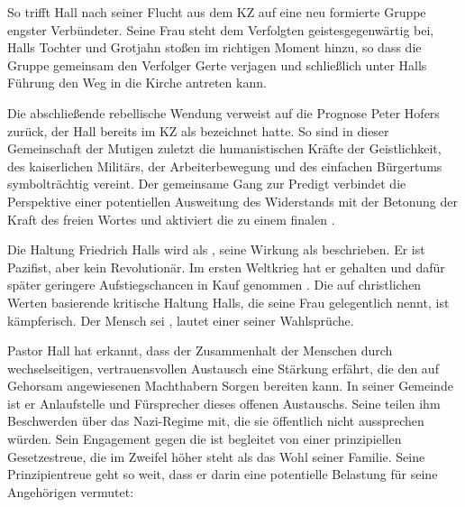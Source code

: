 So trifft Hall nach seiner Flucht aus dem KZ auf eine neu formierte Gruppe
engster Verbündeter. Seine Frau steht dem Verfolgten geistesgegenwärtig bei,
Halls Tochter und Grotjahn stoßen im richtigen Moment hinzu, so dass die
Gruppe gemeinsam den Verfolger Gerte verjagen und schließlich unter Halls
Führung den Weg in die Kirche antreten kann.

Die abschließende rebellische Wendung verweist auf die Prognose Peter Hofers
zurück, der Hall bereits im
KZ als \Cite{Rebell} bezeichnet hatte. So sind in dieser Gemeinschaft
der Mutigen zuletzt die humanistischen Kräfte der Geistlichkeit, des kaiserlichen
Militärs, der Arbeiterbewegung und des einfachen Bürgertums symbolträchtig
vereint. Der gemeinsame Gang zur Predigt verbindet die Perspektive einer
potentiellen Ausweitung des Widerstands mit der Betonung der Kraft des
freien Wortes und aktiviert die  zu
einem finalen .


Die Haltung Friedrich Halls wird als \Cite{betont gerade}, seine Wirkung als
\Cite{nie pathetisch}
beschrieben. Er ist Pazifist, aber kein Revolutionär. Im ersten Weltkrieg
hat er \Cite{Friedenspredigten} gehalten und dafür später geringere
Aufstiegschancen in Kauf genommen . Die auf christlichen
Werten basierende kritische Haltung Halls, die seine Frau gelegentlich
\Cite{Fanatismus} nennt, ist
kämpferisch. Der Mensch sei \Cite{nicht auf dieser Welt, um der Gefahr
  auszuweichen} , lautet einer seiner Wahlsprüche.  

Pastor Hall hat erkannt, dass der Zusammenhalt der Menschen durch
wechselseitigen, vertrauensvollen Austausch eine Stärkung erfährt, die den auf
Gehorsam angewiesenen Machthabern Sorgen bereiten
kann.
In seiner Gemeinde ist er Anlaufstelle und Fürsprecher dieses offenen
Austauschs. Seine \Cite{Pfarrkinder}  teilen ihm
Beschwerden über das
Nazi-Regime mit, die sie öffentlich nicht aussprechen würden. Sein Engagement
gegen die \Cite{krankhafte Furcht}  ist begleitet von
einer prinzipiellen
Gesetzestreue, die im Zweifel höher steht als das Wohl seiner Familie.
Seine Prinzipientreue geht so weit, dass er darin eine potentielle Belastung für
seine Angehörigen vermutet:

